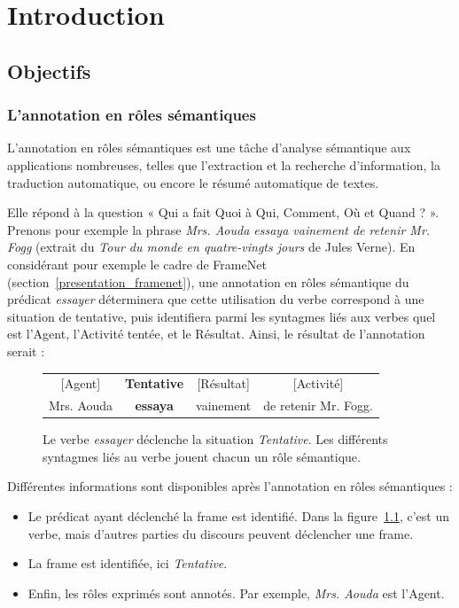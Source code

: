 \chapter{Introduction}
\label{ch:intro}

\section{Objectifs}

\subsection{L'annotation en rôles sémantiques}

L'annotation en rôles sémantiques est une tâche d'analyse sémantique aux
applications nombreuses, telles que l'extraction et la recherche d'information,
la traduction automatique, ou encore le résumé automatique de textes.

Elle répond à la question « Qui a fait Quoi à Qui, Comment, Où et Quand ? ».
Prenons pour exemple la phrase \emph{Mrs. Aouda essaya vainement de retenir Mr.
Fogg} (extrait du \emph{Tour du monde en quatre-vingts jours} de Jules Verne).
En considérant pour exemple le cadre de FrameNet
(section~\ref{presentation_framenet}), une annotation en rôles sémantique du
prédicat \emph{essayer} déterminera que cette utilisation du verbe correspond à
une situation de tentative, puis identifiera parmi les syntagmes liés aux
verbes quel est l'Agent, l'Activité tentée, et le Résultat.  Ainsi, le résultat
de l'annotation serait :

\begin{figure}[ht]
    \centering
    \begin{tabular}{cccc}
    [Agent]  & \textbf{Tentative} & [Résultat]  & [Activité]         \tabularnewline
    Mrs. Aouda & \textbf{essaya}  & vainement & de retenir Mr. Fogg. \tabularnewline
    \end{tabular}
    \caption{\label{fig:introsrl}Le verbe \emph{essayer} déclenche la situation \emph{Tentative}.
    Les différents syntagmes liés au verbe jouent chacun un rôle sémantique.}
\end{figure}

Différentes informations sont disponibles après l'annotation en rôles
sémantiques :

\begin{itemize}
    \item Le prédicat ayant déclenché la frame est identifié. Dans la
        figure~\ref{fig:introsrl}, c'est un verbe, mais d'autres parties du
        discours peuvent déclencher une frame.
    \item La frame est identifiée, ici \emph{Tentative}.
    \item Enfin, les rôles exprimés sont annotés. Par exemple, \emph{Mrs.
        Aouda} est l'Agent.
\end{itemize}

